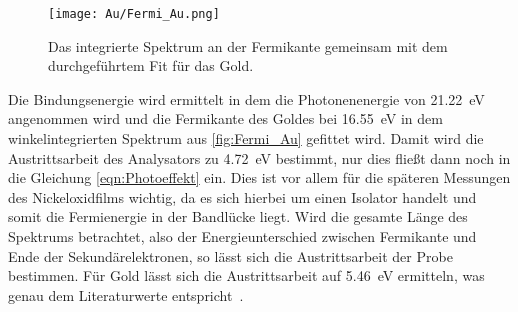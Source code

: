         \begin{figure}
            \centering
            \texttt{[image: Au/Fermi\_Au.png]}
            \caption{Das integrierte Spektrum an der Fermikante gemeinsam mit dem durchgeführtem Fit für das Gold.}
            \label{fig:Fermi_Au}
        \end{figure}
        Die Bindungsenergie wird ermittelt in dem die Photonenenergie von \SI{21.22}{\electronvolt} angenommen wird und die Fermikante des Goldes bei \SI{16.55}{\electronvolt} in dem winkelintegrierten Spektrum aus \autoref{fig:Fermi_Au} gefittet wird.
        Damit wird die Austrittsarbeit des Analysators zu \SI{4.72}{\electronvolt} bestimmt, nur dies fließt dann noch in die Gleichung \ref{eqn:Photoeffekt} ein.
        Dies ist vor allem für die späteren Messungen des Nickeloxidfilms wichtig, da es sich hierbei um einen Isolator handelt und somit die Fermienergie in der Bandlücke liegt.
        Wird die gesamte Länge des Spektrums betrachtet, also der Energieunterschied zwischen Fermikante und Ende der Sekundärelektronen, so lässt sich die Austrittsarbeit der Probe bestimmen.
        Für Gold lässt sich die Austrittsarbeit auf \SI{5.46}{\electronvolt} ermitteln, was genau dem Literaturwerte entspricht~\cite{5A_4}.
   
